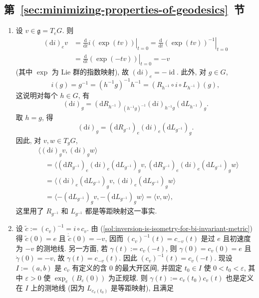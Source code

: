 \subsection{\texorpdfstring{第~\ref{sec:minimizing-properties-of-geodesics}~节}{测地线的最短性}}\label{subsec:solutions-minimizing-properties-of-geodesics}

\begin{description}[font=\normalfont,leftmargin=2em,labelwidth=1.5em]
\begin{enumerate}[label=(\alph*),ref=\alph*,leftmargin=*]
\item\label{sol:inversion-is-isometry-for-bi-invariant-metric} 设 $v\in\mathfrak{g}=T_eG$. 则
\begin{align*}
  (\mathrm{d}i)_ev
  &=\left.\frac{\mathrm{d}}{\mathrm{d}t}i(\exp(tv))\right|_{t=0}
   =\left.\frac{\mathrm{d}}{\mathrm{d}t}(\exp(tv))^{-1}\right|_{t=0}\\
  &=\left.\frac{\mathrm{d}}{\mathrm{d}t}(\exp(-tv))\right|_{t=0}=-v
\end{align*}
(其中 $\exp$ 为 Lie 群的指数映射), 故 $(\mathrm{d}i)_e=-\operatorname{id}$. 此外, 对 $g\in G$,
\[
  i(g)=g^{-1}=(h^{-1}g)^{-1}h^{-1}=(R_{h^{-1}}\circ i\circ L_{h^{-1}})(g),
\]
这说明对每个 $h\in G$, 有
\[
  (\mathrm{d}i)_g=(\mathrm{d}R_{h^{-1}})_{(h^{-1}g)^{-1}}(\mathrm{d}i)_{h^{-1}g}(\mathrm{d}L_{h^{-1}})_g.
\]
取 $h=g$, 得
\[
  (\mathrm{d}i)_g=(\mathrm{d}R_{g^{-1}})_e(\mathrm{d}i)_e(\mathrm{d}L_{g^{-1}})_g.
\]
因此, 对 $v,w\in T_gG$,
\begin{align*}
  &\langle(\mathrm{d}i)_gv,(\mathrm{d}i)_gw\rangle\\
  &\quad=\bigl\langle(\mathrm{d}R_{g^{-1}})_e(\mathrm{d}i)_e(\mathrm{d}L_{g^{-1}})_gv,
        (\mathrm{d}R_{g^{-1}})_e(\mathrm{d}i)_e(\mathrm{d}L_{g^{-1}})_gw\bigr\rangle\\
  &\quad=\langle(\mathrm{d}i)_e(\mathrm{d}L_{g^{-1}})_gv,(\mathrm{d}i)_e(\mathrm{d}L_{g^{-1}})_gw\rangle\\
  &\quad=\langle-(\mathrm{d}L_{g^{-1}})_gv,-(\mathrm{d}L_{g^{-1}})_gw\rangle=\langle v,w\rangle,
\end{align*}
这里用了 $R_{g^{-1}}$ 和 $L_{g^{-1}}$ 都是等距映射这一事实.
\item 设 $\widetilde c:=(c_v)^{-1}=i\circ c_v$. 由 (\ref{sol:inversion-is-isometry-for-bi-invariant-metric}) 得 $\widetilde c(0)=e$ 且 $\dot{\widetilde c}(0)=-v$, 因而 $(c_v)^{-1}(t)=c_{-v}(t)$ 是过 $e$ 且初速度为 $-v$ 的测地线. 另一方面, 若 $\gamma(t):=c_v(-t)$, 则 $\gamma(0)=c_v(0)=e$ 且 $\dot\gamma(0)=-v$, 故 $\gamma(t)=c_{-v}(t)$. 因此 $(c_v)^{-1}(t)=c_v(-t)$. 现设 $I:=(a,b)$ 是 $c_v$ 有定义的含 $0$ 的最大开区间, 并固定 $t_0\in I$ 使 $0<t_0<\varepsilon$, 其中 $\varepsilon>0$ 使 $\exp_e(B_\varepsilon(0))$ 为正规球. 则 $\gamma(t):=c_v(t_0)c_v(t)$ 也是定义在 $I$ 上的测地线 (因为 $L_{c_v(t_0)}$ 是等距映射), 且满足

\end{enumerate}
\end{description}
